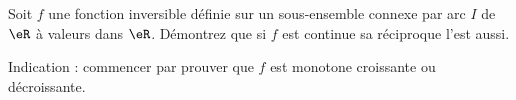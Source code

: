 
\begin{exercice}\label{exo0097}

Soit $f$ une fonction inversible définie sur un sous-ensemble connexe par arc $I$ de $\eR$ à valeurs dans $\eR$. Démontrez que si $f$ est continue sa réciproque l'est aussi.

Indication : commencer par prouver que $f$ est monotone croissante ou décroissante.

\end{exercice}
